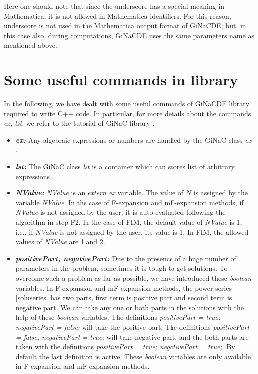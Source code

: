 \documentclass[prd,aps,floats,showkeys,nofootinbib,notitlepage]{revtex4-2}
\begin{document}
	Here one should note that since the underscore has a special meaning in Mathematica, it is not allowed in Mathematica identifiers. For this reason, underscore is not used in the Mathematica output format of GiNaCDE; but, in this case also, during computations, GiNaCDE uses the same parameters name as mentioned above.
	\section{Some useful commands in library}\label{sec:command}
	In the following, we have dealt with some useful commands of GiNaCDE library required to write C++ code. In particular, for more details about the commands {\em ex, lst}, we refer to the tutorial of GiNaC library \cite{ginac}.
	\begin{itemize}
		\item[] {\em \textbf{ex:}}  Any algebraic expressions or numbers are handled by the GiNaC class {\em ex} \cite{ginac}. 
		\item[] {\em \textbf{lst:}} The GiNaC class {\em lst} is a container  which can stores list of arbitrary expressions \cite{ginac}.
		\item[] {\em \textbf{NValue:}} {\em NValue} is an {\em extern ex} variable. The value of $N$ is assigned by the variable {\em NValue}. In the case of F-expansion and mF-expansion methods, if {\em NValue} is not assigned by the user, it is auto-evaluated following the algorithm in step F2. In the case of FIM, the default value of {\em NValue} is 1, i.e., if {\em NValue} is not assigned by the user, its value is 1. In FIM, the allowed values of {\em NValue} are 1 and 2.
		
		\item[] {\em \textbf{positivePart, negativePart:}} Due to the presence of a huge number of parameters in the problem, sometimes it is tough to get solutions. To overcome such a problem as far as possible, we have introduced these {\em boolean} variables. In F-expansion and mF-expansion methods, the power series \eqref{soluseries} has two parts, first term is positive part and second term is negative part. We can take any one or both parts in the solutions with the help of these {\em boolean} variables. The definitions {\em positivePart = true; negativePart = false;} will take the positive part. The definitions {\em positivePart = false; negativePart = true;} will take negative part, and the both parts are taken with the definitions {\em positivePart = true; negativePart = true;}. By default the last definition is active. These {\em boolean} variables are only available in F-expansion and mF-expansion methods. 
		

\end{itemize}
\end{document}
